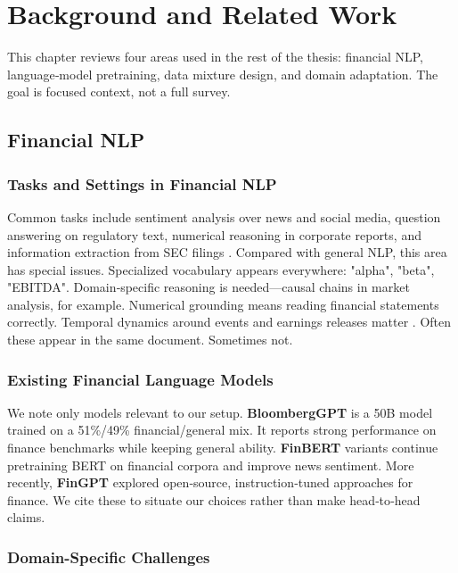 \chapter{Background and Related Work}

This chapter reviews four areas used in the rest of the thesis: financial NLP, language‑model pretraining, data mixture design, and domain adaptation. The goal is focused context, not a full survey.

\section{Financial NLP}

\subsection{Tasks and Settings in Financial NLP}

Common tasks include sentiment analysis over news and social media, question answering on regulatory text, numerical reasoning in corporate reports, and information extraction from SEC filings \parencite{araci2019finbert, chen2021finqa}. Compared with general NLP, this area has special issues. Specialized vocabulary appears everywhere: "alpha", "beta", "EBITDA". Domain‑specific reasoning is needed—causal chains in market analysis, for example. Numerical grounding means reading financial statements correctly. Temporal dynamics around events and earnings releases matter \parencite{wu2023bloomberggpt, araci2019finbert}. Often these appear in the same document. Sometimes not.

\subsection{Existing Financial Language Models}

We note only models relevant to our setup. \textbf{BloombergGPT} \parencite{wu2023bloomberggpt} is a 50B model trained on a 51\%/49\% financial/general mix. It reports strong performance on finance benchmarks while keeping general ability. \textbf{FinBERT} variants \parencite{araci2019finbert, yang2020finbert} continue pretraining BERT on financial corpora and improve news sentiment. More recently, \textbf{FinGPT} \parencite{yang2023fingpt} explored open‑source, instruction‑tuned approaches for finance. We cite these to situate our choices rather than make head‑to‑head claims.

\subsection{Domain-Specific Challenges}

